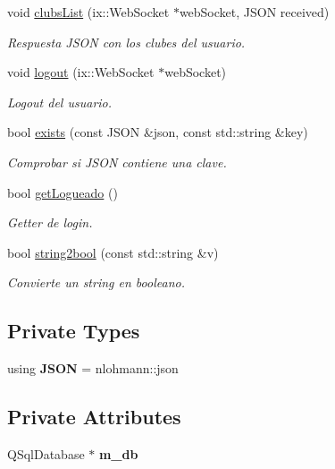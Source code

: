 \begin{DoxyCompactItemize}
void \mbox{\hyperlink{classapp_aacb1fe686708ce187073676232491baf}{clubs\+List}} (ix\+::\+Web\+Socket $\ast$web\+Socket, J\+S\+ON received)
\begin{DoxyCompactList}\small\item\em Respuesta J\+S\+ON con los clubes del usuario. \end{DoxyCompactList}\item 
void \mbox{\hyperlink{classapp_a93176ba428640e16ea767d95319ce0c2}{logout}} (ix\+::\+Web\+Socket $\ast$web\+Socket)
\begin{DoxyCompactList}\small\item\em Logout del usuario. \end{DoxyCompactList}\item 
bool \mbox{\hyperlink{classapp_a42e2a44d3325daf63b3ec57b8921d1b5}{exists}} (const J\+S\+ON \&json, const std\+::string \&key)
\begin{DoxyCompactList}\small\item\em Comprobar si J\+S\+ON contiene una clave. \end{DoxyCompactList}\item 
bool \mbox{\hyperlink{classapp_a9d5d32bf19b4ae0a9c9d7fab8d87ac0f}{get\+Logueado}} ()
\begin{DoxyCompactList}\small\item\em Getter de login. \end{DoxyCompactList}\item 
bool \mbox{\hyperlink{classapp_af87506f90057b288a801f2a0d4c00ef4}{string2bool}} (const std\+::string \&v)
\begin{DoxyCompactList}\small\item\em Convierte un string en booleano. \end{DoxyCompactList}\end{DoxyCompactItemize}
\subsection*{Private Types}
\begin{DoxyCompactItemize}
\item 
\mbox{\label{classapp_a28638f5d121e9e12247d69575bda5e6d}} 
using {\bfseries J\+S\+ON} = nlohmann\+::json
\end{DoxyCompactItemize}
\subsection*{Private Attributes}
\begin{DoxyCompactItemize}
\item 
\mbox{\label{classapp_a68f450976044452caeb444182c5166ff}} 
Q\+Sql\+Database $\ast$ {\bfseries m\+\_\+db}
\end{DoxyCompactItemize}


